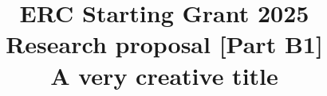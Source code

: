 \documentclass[a4paper,12pt,english]{article}
\begin{document}
\title{ \textbf{\normalsize {ERC Starting Grant 2025} \\ \normalsize Research proposal [Part B1] \\  \large A very creative title \\ \large \acr }}

\author{%
}
\date{}

\maketitle
\thispagestyle{fancy}


 
\clearpage

\printbibliography

\clearpage







 
\end{document}
